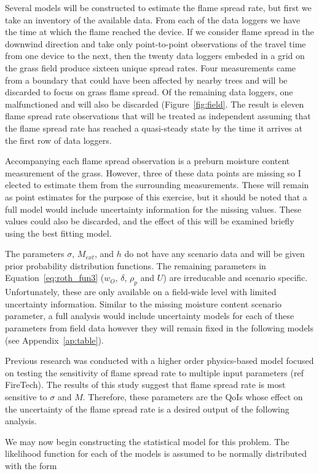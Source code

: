 \documentclass[11pt]{article}
\begin{document}
Several models will be constructed to estimate the flame spread rate, but first we take an inventory of the available data. From each of the data loggers we have the time at which the flame reached the device. If we consider flame spread in the downwind direction and take only point-to-point observations of the travel time from one device to the next, then the twenty data loggers embeded in a grid on the grass field produce sixteen unique spread rates. Four measurements came from a boundary that could have been affected by nearby trees and will be discarded to focus on grass flame spread. Of the remaining data loggers, one malfunctioned and will also be discarded (Figure~\ref{fig:field}. The result is eleven flame spread rate observations that will be treated as independent assuming that the flame spread rate has reached a quasi-steady state by the time it arrives at the first row of data loggers.

Accompanying each flame spread observation is a preburn moisture content measurement of the grass. However, three of these data points are missing so I elected to estimate them from the surrounding measurements. These will remain as point estimates for the purpose of this exercise, but it should be noted that a full model would include uncertainty information for the missing values. These values could also be discarded, and the effect of this will be examined briefly using the best fitting model.

The parameters $\sigma$, $M_{ext}$, and $h$ do not have any scenario data and will be given prior probability distribution functions. The remaining parameters in Equation~\ref{eq:roth_fun3} ($w_O$, $\delta$, $\rho_p$ and $U$) are irreducable and scenario specific. Unfortunately, these are only available on a field-wide level with limited uncertainty information. Similar to the missing moisture content scenario parameter, a full analysis would include uncertainty models for each of these parameters from field data however they will remain fixed in the following models (see Appendix~\ref{ap:table}).

Previous research was conducted with a higher order physics-based model focused on testing the sensitivity of flame spread rate to multiple input parameters (ref FireTech). The results of this study suggest that flame spread rate is most sensitive to $\sigma$ and $M$. Therefore, these parameters are the QoIs whose effect on the uncertainty of the flame spread rate is a desired output of the following analysis.

We may now begin constructing the statistical model for this problem. The likelihood function for each of the models is assumed to be normally distributed with the form
\end{document}
